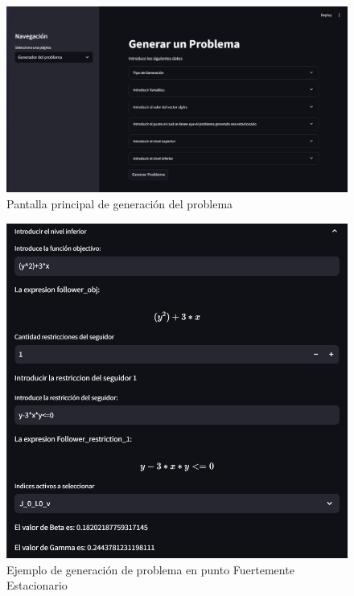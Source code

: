 \begin{figure}[H]
    \centering
    \includegraphics[width=\textwidth]{Graphics/front_streamlitpng.png}
    \caption{Pantalla principal de generación del problema}
    \label{fig:front_generator_page}
\end{figure}

\begin{figure}[H]
    \centering
    \includegraphics[width=\textwidth]{Graphics/Ejemplo_introducir_follower_rest.png}
    \caption{Ejemplo de generación de problema en punto Fuertemente Estacionario}
    \label{fig:example_strong_stationary_front_generator}
\end{figure}
